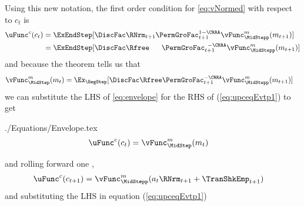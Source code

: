 \documentclass[titlepage, headings=optiontotocandhead]{\econtex}
\begin{document}
Using this new notation, the first order condition for \eqref{eq:vNormed} with respect to ${c}_{t}$ is
\begin{equation}\begin{gathered}\begin{aligned}
      \uFunc^{{c}}({c}_{t})  & = \ExEndStep[\DiscFac \RNrm_{t+1}\PermGroFac_{t+1}^{1-\CRRA}\null{\vFunc}^{{m}}_{\MidStepp}({m}_{t+1})]  \label{eq:upceqEvtp1}
      \\                        & =  \ExEndStep[\DiscFac\Rfree\phantom{._{t+1}}\PermGroFac_{t+1}^{\phantom{1}-\CRRA}\null{\vFunc}^{{m}}_{\MidStepp}({m}_{t+1})]
    \end{aligned}\end{gathered}\end{equation}
and because the  theorem tells us that
\begin{equation}\begin{gathered}\begin{aligned}
      \null{\vFunc}^{{m}}_{\MidStep}({m}_{t})  & =  \Ex_{\BegStep} [\DiscFac\Rfree\PermGroFac_{t+1}^{-\CRRA}\null{\vFunc}^{{m}}_{\MidStepp}({m}_{t+1})] \label{eq:envelope}
    \end{aligned}\end{gathered}\end{equation}
we can substitute the LHS of \eqref{eq:envelope} for the RHS of
(\ref{eq:upceqEvtp1}) to get
\begin{verbatimwrite}{./Equations/Envelope.tex}
  \begin{equation}\begin{gathered}\begin{aligned}
        \uFunc^{{c}}({c}_{t})  & = \null{\vFunc}^{{m}}_{\MidStep}({m}_{t})\label{eq:Envelope}
      \end{aligned}\end{gathered}\end{equation}
\end{verbatimwrite}
\unskip
and rolling forward one {\interval},
\begin{equation}\begin{gathered}\begin{aligned}
      \uFunc^{{c}}({c}_{t+1})  & = \null{\vFunc}^{{m}}_{\MidStepp}({a}_{t}\RNrm_{t+1}+\TranShkEmp_{t+1}) \label{eq:upctp1EqVpxtp1}
    \end{aligned}\end{gathered}\end{equation}
and substituting the LHS in equation (\ref{eq:upceqEvtp1})
\end{document}

